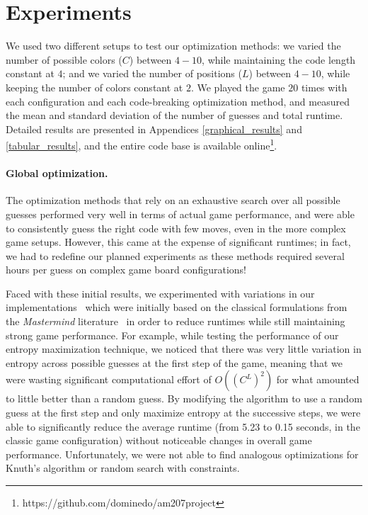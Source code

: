 \documentclass[11pt]{article}
\begin{document}
\section{Experiments}

We used two different setups to test our optimization methods: we varied the number of possible colors ($C$) between $4-10$, while maintaining the code length constant at $4$; and we varied the number of positions ($L$) between $4-10$, while keeping the number of colors constant at $2$. We played the game $20$ times with each configuration and each code-breaking optimization method, and measured the mean and standard deviation of the number of guesses and total runtime. Detailed results are presented in Appendices \ref{graphical_results} and \ref{tabular_results}, and the entire code base is available online\footnote{https://github.com/dominedo/am207project}.

\paragraph{Global optimization.} The optimization methods that rely on an exhaustive search over all possible guesses performed very well in terms of actual game performance, and were able to consistently guess the right code with few moves, even in the more complex game setups. However, this came at the expense of significant runtimes; in fact, we had to redefine our planned experiments as these methods required several hours per guess on complex game board configurations!

Faced with these initial results, we experimented with variations in our implementations \textendash \ which were initially based on the classical formulations from the \textit{Mastermind} literature \textendash \, in order to reduce runtimes while still maintaining strong game performance. For example, while testing the performance of our entropy maximization technique, we noticed that there was very little variation in entropy across possible guesses at the first step of the game, meaning that we were wasting significant computational effort of $O((C^L)^2)$ for what amounted to little better than a random guess. By modifying the algorithm to use a random guess at the first step and only maximize entropy at the successive steps, we were able to significantly reduce the average runtime (from 5.23 to 0.15 seconds, in the classic game configuration) without noticeable changes in overall game performance. Unfortunately, we were not able to find analogous optimizations for Knuth's algorithm or random search with constraints.
\end{document}
